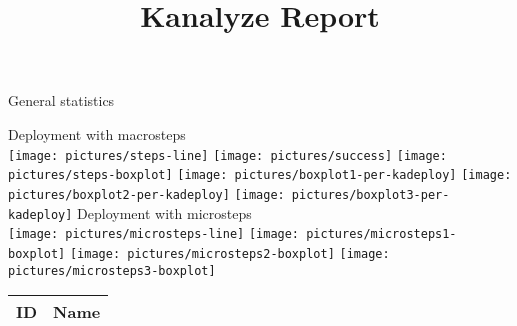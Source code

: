 \documentclass[12pt]{article}
\title{Kanalyze Report}
\date{\currenttime}
\begin{document}
\maketitle
\LARGE General statistics
\newline

\newline
{\LARGE Deployment with macrosteps}\\
\texttt{[image: pictures/steps-line]}
\texttt{[image: pictures/success]}
\texttt{[image: pictures/steps-boxplot]}
\texttt{[image: pictures/boxplot1-per-kadeploy]}
\texttt{[image: pictures/boxplot2-per-kadeploy]}
\texttt{[image: pictures/boxplot3-per-kadeploy]}
\newpage
{\LARGE Deployment with microsteps}\\
\texttt{[image: pictures/microsteps-line]}
\texttt{[image: pictures/microsteps1-boxplot]}
\texttt{[image: pictures/microsteps2-boxplot]}
\texttt{[image: pictures/microsteps3-boxplot]}
\newline
\begin{table}
\small
\begin{tabular}{|l|l|}
\hline
ID & Name \\
\hline

\hline
\end{tabular}
\end{table}
\end{document}
